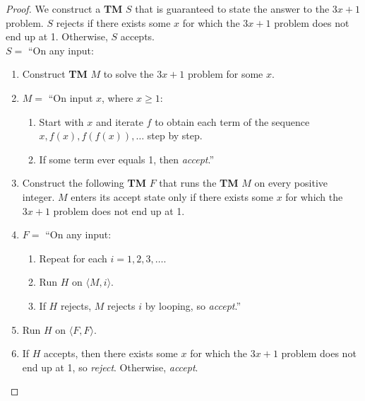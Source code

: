 \documentclass[11pt]{article}
\begin{document}
\begin{proof}
We construct a \textbf{TM} $S$ that is guaranteed to state the answer to the $3x + 1$ problem. $S$ rejects if there exists some $x$ for which the $3x + 1$ problem does not end up at 1. Otherwise, $S$ accepts. \\

$S =$ \textquotedblleft On any input:
\begin{enumerate}
\item Construct \textbf{TM} $M$ to solve the $3x + 1$ problem for some $x$. 
\item $M =$ \textquotedblleft On input $x$, where $x \geq 1$:
\begin{enumerate}[1.]
\item Start with $x$ and iterate $f$ to obtain each term of the sequence  $x, f(x), f(f(x)),\dots$ step by step.
\item If some term ever equals 1, then \textit{accept}.\textquotedblright
\end{enumerate}
\item Construct the following \textbf{TM} $F$ that runs the \textbf{TM} $M$ on every positive integer. $M$ enters its accept state only if there exists some $x$ for which the $3x + 1$ problem does not end up at 1.
\item $F =$ \textquotedblleft On any input:
\begin{enumerate}[1.]
\item Repeat for each $i = 1,2,3,\dots$.
\item \hspace*{0.5cm} Run $H$ on $\langle M, i \rangle$.
\item \hspace*{0.5cm} If $H$ rejects, $M$ rejects $i$ by looping, so \textit{accept}.\textquotedblright
\end{enumerate}
\item Run $H$ on $\langle F, F \rangle$.
\item If $H$ accepts, then there exists some $x$ for which the $3x + 1$ problem does not end up at 1, so \textit{reject}. Otherwise, \textit{accept}.
\end{enumerate}
\end{proof}
\end{document}
